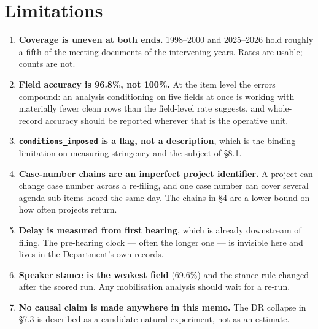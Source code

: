 \documentclass[11pt]{article}
\begin{document}
\section{Limitations}

\begin{enumerate}
\item \textbf{Coverage is uneven at both ends.} 1998--2000 and 2025--2026 hold roughly a fifth
of the meeting documents of the intervening years. Rates are usable; counts are not.
\item \textbf{Field accuracy is 96.8\%, not 100\%.} At the item level the errors compound: an
analysis conditioning on five fields at once is working with materially fewer clean rows than
the field-level rate suggests, and whole-record accuracy should be reported wherever that is
the operative unit.
\item \textbf{\texttt{conditions\_imposed} is a flag, not a description}, which is the binding
limitation on measuring stringency and the subject of \S8.1.
\item \textbf{Case-number chains are an imperfect project identifier.} A project can change
case number across a re-filing, and one case number can cover several agenda sub-items heard
the same day. The chains in \S4 are a lower bound on how often projects return.
\item \textbf{Delay is measured from first hearing}, which is already downstream of filing.
The pre-hearing clock --- often the longer one --- is invisible here and lives in the
Department's own records.
\item \textbf{Speaker stance is the weakest field} (69.6\%) and the stance rule changed after
the scored run. Any mobilisation analysis should wait for a re-run.
\item \textbf{No causal claim is made anywhere in this memo.} The DR collapse in \S7.3 is
described as a candidate natural experiment, not as an estimate.
\end{enumerate}


\end{document}
